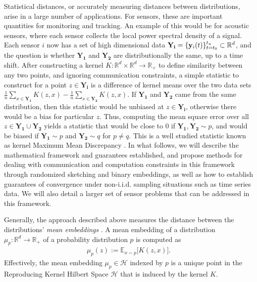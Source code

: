 Statistical distances, or accurately measuring distances between distributions, arise in a large number of applications.  For sensors, these are important quantities for monitoring and tracking.
An example of this would be for acoustic sensors, where each sensor collects the local power spectral density of a signal.  Each sensor $i$ now has a set of high dimensional data $\mathbf{Y_i}=\{\mathbf{y}_i(t)\}_{t=t_0}^{t_n}\subset \mathbb{R}^d$, and the question is whether $\mathbf{Y_1}$ and $\mathbf{Y_2}$ are distributionally the same, up to a time shift.  After constructing a kernel $K: \mathbb{R}^d\times \mathbb{R}^d \rightarrow \mathbb{R}_+$ to define similarity between any two points, and ignoring communication constraints, a simple statistic to construct for a point $z \in \mathbf{Y_i}$ is a difference of kernel means over the two data sets $\frac{1}{n}\sum_{x\in \mathbf{Y_1}} K(z,x) - \frac{1}{n}\sum_{x\in \mathbf{Y_2}} K(z,x)$.  If $\mathbf{Y_1}$ and $\mathbf{Y_2}$ came from the same distribution, then this statistic would be unbiased at $z\in \mathbf{Y_i}$, otherwise there would be a bias for particular $z$.  Thus, computing the mean square error over all $z\in \mathbf{Y_1}\cup \mathbf{Y_2}$ yields a statistic that would be close to 0 if $\mathbf{Y_1},\mathbf{Y_2}\sim p$, and would be biased if $\mathbf{Y_1}\sim p$ and $\mathbf{Y_2}\sim q$ for $p\neq q$.  This is a well studied statistic known as kernel Maximum Mean Discrepancy \cite{gretton2012kernel}.  In what follows, we will describe the mathematical framework and guarantees established, and propose methods for dealing with communication and computation constraints in this framework through randomized sketching and binary embeddings, as well as how to establish guarantees of convergence under non-i.i.d. sampling situations such as time series data.  We will also detail a larger set of sensor problems that can be addressed in this framework.


Generally, the approach described above measures the distance between the distributions' \emph{mean embeddings} \cite{muandet2017kernel}.  A mean embedding of a distribution $\mu_p:\mathbb{R}^d\rightarrow \mathbb{R}_+$ of a probability distribution $p$ is computed as
\begin{align*}
    \mu_p(z) := \mathbb{E}_{x\sim p} \big[K(z,x)\big].
\end{align*}
Effectively, the mean embedding $\mu_p\in\mathcal{H}$ indexed by $p$ is a unique point in the Reproducing Kernel Hilbert Space $\mathcal{H}$ that is induced by the kernel $K$.

